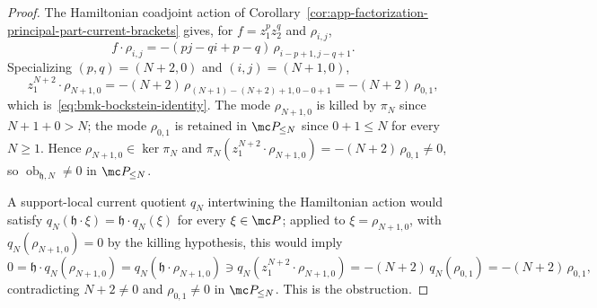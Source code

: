 \begin{proof}
  The Hamiltonian coadjoint action of
  Corollary~\ref{cor:app-factorization-principal-part-current-brackets}
  gives, for \(f=z_1^pz_2^q\) and \(\rho_{i,j}\),
  \[
    f\cdot\rho_{i,j}=-(pj-qi+p-q)\,\rho_{i-p+1,j-q+1}.
  \]
  Specializing \((p,q)=(N+2,0)\) and \((i,j)=(N+1,0)\),
  \[
    z_1^{N+2}\cdot\rho_{N+1,0}=-(N+2)\,\rho_{(N+1)-(N+2)+1,0-0+1}
      =-(N+2)\,\rho_{0,1},
  \]
  which is~\eqref{eq:bmk-bockstein-identity}.  The mode
  \(\rho_{N+1,0}\) is killed by \(\pi_N\) since \(N+1+0>N\); the mode
  \(\rho_{0,1}\) is retained in \(\mc P_{\leq N}\) since \(0+1\leq N\)
  for every \(N\geq1\).  Hence
  \(\rho_{N+1,0}\in\ker\pi_N\) and
  \(\pi_N(z_1^{N+2}\cdot\rho_{N+1,0})=-(N+2)\,\rho_{0,1}\neq 0\), so
  \(\operatorname{ob}_{\mathfrak h,N}\neq 0\) in \(\mc P_{\leq N}\).

  A support-local current quotient \(q_N\) intertwining the
  Hamiltonian action would satisfy
  \(q_N(\mathfrak h\cdot\xi)=\mathfrak h\cdot q_N(\xi)\) for every
  \(\xi\in\mc P\); applied to \(\xi=\rho_{N+1,0}\), with
  \(q_N(\rho_{N+1,0})=0\) by the killing hypothesis, this would imply
  \[
    0=\mathfrak h\cdot q_N(\rho_{N+1,0})
      =q_N(\mathfrak h\cdot\rho_{N+1,0})
      \ni q_N(z_1^{N+2}\cdot\rho_{N+1,0})
      =-(N+2)\,q_N(\rho_{0,1})
      =-(N+2)\,\rho_{0,1},
  \]
  contradicting \(N+2\neq 0\) and \(\rho_{0,1}\neq 0\) in
  \(\mc P_{\leq N}\).  This is the obstruction.


\end{proof}
